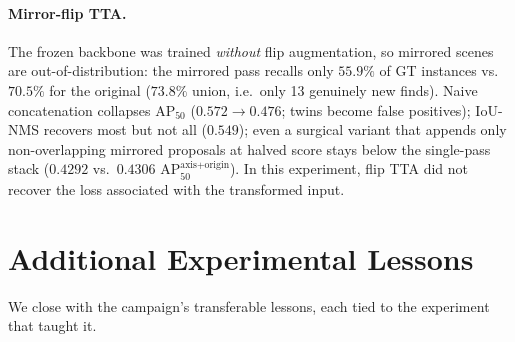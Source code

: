 \documentclass[11pt]{article}
\newcommand{\metric}{AP$_{50}^{\text{axis+origin}}$}
\newcommand{\apfifty}{AP$_{50}$}
\begin{document}
\paragraph{Mirror-flip TTA.} The frozen backbone was trained \emph{without}
flip augmentation, so mirrored scenes are out-of-distribution: the mirrored
pass recalls only $55.9\%$ of GT instances vs.\ $70.5\%$ for the original
($73.8\%$ union, i.e.\ only 13 genuinely new finds). Naive concatenation
collapses \apfifty{} ($0.572 \rightarrow 0.476$; twins become false
positives); IoU-NMS recovers most but not all ($0.549$); even a surgical
variant that appends only non-overlapping mirrored proposals at halved
score stays below the single-pass stack ($0.4292$ vs.\ $0.4306$
\metric{}). In this experiment, flip TTA did not recover the loss associated with the transformed input.


\clearpage
\section{Additional Experimental Lessons}
\label{sec:lessons}

We close with the campaign's transferable lessons, each tied to the
experiment that taught it.
\end{document}

